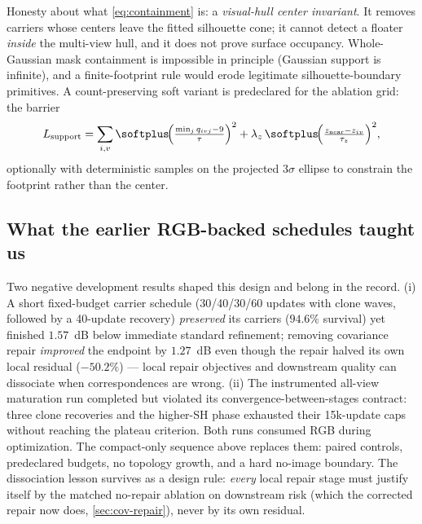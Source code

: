 Honesty about what \cref{eq:containment} is: a \emph{visual-hull center invariant}.  It
removes carriers whose centers leave the fitted silhouette cone; it cannot detect a floater
\emph{inside} the multi-view hull, and it does not prove surface occupancy.  Whole-Gaussian
mask containment is impossible in principle (Gaussian support is infinite), and a
finite-footprint rule would erode legitimate silhouette-boundary primitives.  A
count-preserving soft variant is predeclared for the ablation grid: the barrier
\begin{equation}
  L_{\text{support}} = \sum_{i,v}
    \softplus\!\Big(\tfrac{\min_j q_{ivj} - 9}{\tau}\Big)^{2}
    + \lambda_z\, \softplus\!\Big(\tfrac{z_{\text{near}} - z_{iv}}{\tau_z}\Big)^{2},
  \label{eq:soft-support}
\end{equation}
optionally with deterministic samples on the projected $3\sigma$ ellipse to constrain the
footprint rather than the center.  

\subsection{What the earlier RGB-backed schedules taught us}
\label{sec:carrier-history}

Two negative development results shaped this design and belong in the record.  (i) A short
fixed-budget carrier schedule (30/40/30/60 updates with clone waves, followed by a 40-update
recovery) \emph{preserved} its carriers ($94.6\%$ survival) yet finished $1.57$~dB below
immediate standard refinement; removing covariance repair \emph{improved} the endpoint by
$1.27$~dB even though the repair halved its own local residual ($-50.2\%$) --- local repair
objectives and downstream quality can dissociate when correspondences are
wrong.  (ii) The instrumented all-view maturation run
completed but violated its convergence-between-stages contract: three clone recoveries and
the higher-SH phase exhausted their 15k-update caps without reaching the plateau
criterion.  Both runs consumed RGB during optimization.
The compact-only sequence above replaces them: paired controls, predeclared budgets, no
topology growth, and a hard no-image boundary.  The dissociation lesson survives as a design
rule: \emph{every} local repair stage must justify itself by the matched no-repair ablation
on downstream risk (which the corrected repair now does, \cref{sec:cov-repair}), never by
its own residual.

